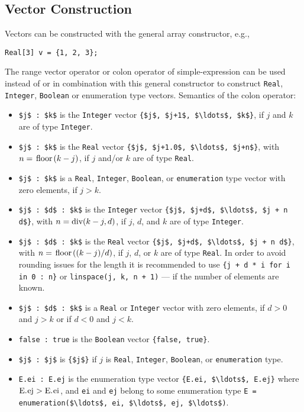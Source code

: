 \subsection{Vector Construction}

Vectors can be constructed with the general array constructor, e.g.,
\begin{lstlisting}[language=modelica]
Real[3] v = {1, 2, 3};
\end{lstlisting}
The range vector operator or colon operator of simple-expression can be used instead of or in combination with this general constructor to construct \lstinline!Real!, \lstinline!Integer!, \lstinline!Boolean! or enumeration type vectors.  Semantics of the colon operator:
\begin{itemize}
\item
  \lstinline!$j$ : $k$! is the \lstinline!Integer! vector \lstinline!{$j$, $j+1$, $\ldots$, $k$}!, if $j$ and $k$ are of type
  \lstinline!Integer!.
\item
  \lstinline!$j$ : $k$! is the \lstinline!Real! vector \lstinline!{$j$, $j+1.0$, $\ldots$, $j+n$}!, with $n = \text{\lstinline!floor!}(k - j)$, if
  $j$ and/or $k$ are of type \lstinline!Real!.
\item
  \lstinline!$j$ : $k$! is a \lstinline!Real!, \lstinline!Integer!, \lstinline!Boolean!, or \lstinline!enumeration! type vector with zero elements, if $j > k$.
\item
  \lstinline!$j$ : $d$ : $k$! is the \lstinline!Integer! vector \lstinline!{$j$, $j+d$, $\ldots$, $j + n d$}!, with $n = \text{\lstinline!div!}(k - j, d)$, if $j$, $d$, and $k$ are of type \lstinline!Integer!.
\item
  \lstinline!$j$ : $d$ : $k$! is the \lstinline!Real! vector \lstinline!{$j$, $j+d$, $\ldots$, $j + n d$}!, with $n = \text{\lstinline!floor!}((k-j)/d)$,
  if $j$, $d$, or $k$ are of type \lstinline!Real!.  In order to avoid rounding issues for the length it is recommended to use \lstinline!{j + d * i for i in 0 : n}! or
  \lstinline!linspace(j, k, n + 1)! --- if the number of elements are known.
\item
  \lstinline!$j$ : $d$ : $k$! is a \lstinline!Real! or \lstinline!Integer! vector with zero elements, if $d > 0$ and $j > k$ or if $d < 0$ and $j < k$.
\item
  \lstinline!false : true! is the \lstinline!Boolean! vector \lstinline!{false, true}!.
\item
  \lstinline!$j$ : $j$! is \lstinline!{$j$}! if $j$ is \lstinline!Real!, \lstinline!Integer!, \lstinline!Boolean!, or \lstinline!enumeration! type.
\item
  \lstinline!E.ei : E.ej! is the enumeration type vector \lstinline!{E.ei, $\ldots$, E.ej}! where
  $\text{\lstinline!E.ej!} > \text{\lstinline!E.ei!}$, and \lstinline!ei! and \lstinline!ej! belong to some enumeration type
  \lstinline!E = enumeration($\ldots$, ei, $\ldots$, ej, $\ldots$)!.
\end{itemize}


